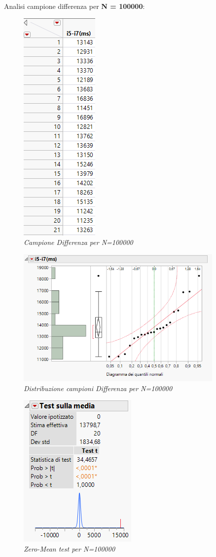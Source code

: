 Analisi campione differenza per \textbf{N = 100000}:
\begin{figure}[H]
	\centering
	\includegraphics{img/hw0/diff5.png}
	\caption{\textit{Campione Differenza per N=100000}}
\end{figure}
\begin{figure}[H]
	\centering
	\includegraphics[width=0.9\textwidth]{img/hw0/statistiche100000.png}
	\caption{\textit{Distribuzione campioni Differenza per N=100000}}
\end{figure}
\begin{figure}[H]
	\centering
	\includegraphics{img/hw0/test100000.png}
	\caption{\textit{Zero-Mean test per N=100000}}
\end{figure}
